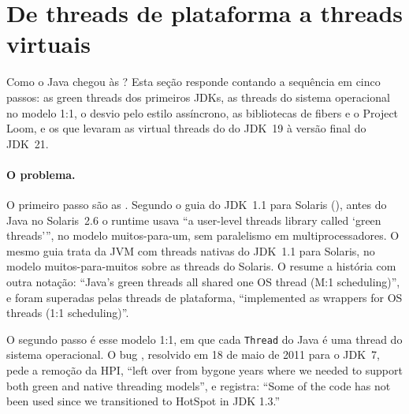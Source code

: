 \section{De threads de plataforma a threads virtuais}
\label{sec:threads-ate-vt}

Como o Java chegou às ? Esta seção responde contando a
sequência em cinco passos: as green threads dos primeiros JDKs, as
threads do sistema operacional no modelo 1:1, o desvio pelo estilo
assíncrono, as bibliotecas de fibers e o Project Loom, e os
 que levaram as virtual
threads do  do JDK~19 à versão final do JDK~21.

\paragraph{O problema.}
O primeiro passo são as . Segundo o guia do JDK~1.1 para Solaris
(), antes do Java no Solaris~2.6 o
runtime usava \enquote{a user-level threads library called
\enquote{green threads}}, no modelo muitos-para-um, sem paralelismo em
multiprocessadores. O mesmo guia trata da JVM com threads nativas do
JDK~1.1 para Solaris, no modelo muitos-para-muitos sobre as threads do
Solaris. O  resume a história com outra notação:
\enquote{Java's green threads all shared one OS thread (M:1
scheduling)}, e foram superadas pelas threads de plataforma,
\enquote{implemented as wrappers for OS threads (1:1 scheduling)}.

O segundo passo é esse modelo 1:1, em que cada \texttt{Thread} do Java
é uma thread do sistema operacional. O bug ,
resolvido em 18 de maio de 2011 para o JDK~7, pede a remoção da HPI,
\enquote{left over from bygone years where we needed to support both
green and native threading models}, e registra: \enquote{Some of the
code has not been used since we transitioned to HotSpot in JDK 1.3.}

